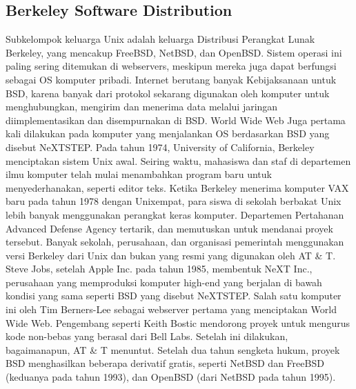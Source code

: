 \subsection{Berkeley Software Distribution}
	\begin{enumerate}
		Subkelompok keluarga Unix adalah keluarga Distribusi Perangkat Lunak Berkeley, yang mencakup FreeBSD, NetBSD, dan OpenBSD. Sistem operasi ini paling sering ditemukan di webservers, meskipun mereka juga dapat berfungsi sebagai OS komputer pribadi. Internet berutang banyak Kebijaksanaan untuk BSD, karena banyak dari protokol sekarang digunakan oleh komputer untuk menghubungkan, mengirim dan menerima data melalui jaringan diimplementasikan dan disempurnakan di BSD. World Wide Web Juga pertama kali dilakukan pada komputer yang menjalankan OS berdasarkan BSD yang disebut NeXTSTEP.
		Pada tahun 1974, University of California, Berkeley menciptakan sistem Unix awal. Seiring waktu, mahasiswa dan staf di departemen ilmu komputer telah mulai menambahkan program baru untuk menyederhanakan, seperti editor teks. Ketika Berkeley menerima komputer VAX baru pada tahun 1978 dengan Unixempat, para siswa di sekolah berbakat Unix lebih banyak menggunakan perangkat keras komputer. Departemen Pertahanan Advanced Defense Agency tertarik, dan memutuskan untuk mendanai proyek tersebut. Banyak sekolah, perusahaan, dan organisasi pemerintah menggunakan versi Berkeley dari Unix dan bukan yang resmi yang digunakan oleh AT & T.
		Steve Jobs, setelah Apple Inc. pada tahun 1985, membentuk NeXT Inc., perusahaan yang memproduksi komputer high-end yang berjalan di bawah kondisi yang sama seperti BSD yang disebut NeXTSTEP. Salah satu komputer ini oleh Tim Berners-Lee sebagai webserver pertama yang menciptakan World Wide Web.
		Pengembang seperti Keith Bostic mendorong proyek untuk mengurus kode non-bebas yang berasal dari Bell Labs. Setelah ini dilakukan, bagaimanapun, AT & T menuntut. Setelah dua tahun sengketa hukum, proyek BSD menghasilkan beberapa derivatif gratis, seperti NetBSD dan FreeBSD (keduanya pada tahun 1993), dan OpenBSD (dari NetBSD pada tahun 1995).
	\end{enumerate}
